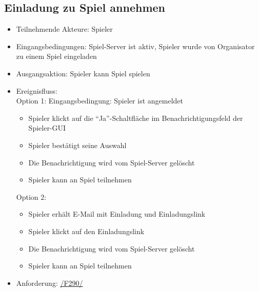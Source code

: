 \documentclass[a4paper]{scrreprt}
\begin{document}
    \subsection{Einladung zu Spiel annehmen}
    \begin{itemize}
        \item Teilnehmende Akteure: \Gls{Spieler}

        \item Eingangsbedingungen: \Gls{Spiel-Server} ist aktiv, Spieler wurde von \Gls{Organisator} zu einem Spiel eingeladen
        \item Ausgangsaktion: \Gls{Spieler} kann \Gls{Spiel} spielen
        \item Ereignisfluss:\\
        Option 1: 
        Eingangsbedingung: \Gls{Spieler} ist angemeldet
        \begin{itemize}
            \item \Gls{Spieler} klickt auf die \enquote{Ja}-Schaltfläche im Benachrichtigungsfeld der Spieler-GUI
            \item \Gls{Spieler} bestätigt seine Auswahl
            \item Die Benachrichtigung wird vom \Gls{Spiel-Server} gelöscht
            \item \Gls{Spieler} kann an \Gls{Spiel} teilnehmen
        \end{itemize}
        Option 2: 
        \begin{itemize}
            \item \Gls{Spieler} erhält E-Mail mit Einladung und Einladungslink
            \item \Gls{Spieler} klickt auf den Einladungslink
            \item Die Benachrichtigung wird vom \Gls{Spiel-Server} gelöscht
            \item \Gls{Spieler} kann an \Gls{Spiel} teilnehmen
        \end{itemize}

        \item Anforderung: \hyperlink{F290}{/F290/}
    \end{itemize}
\end{document}
